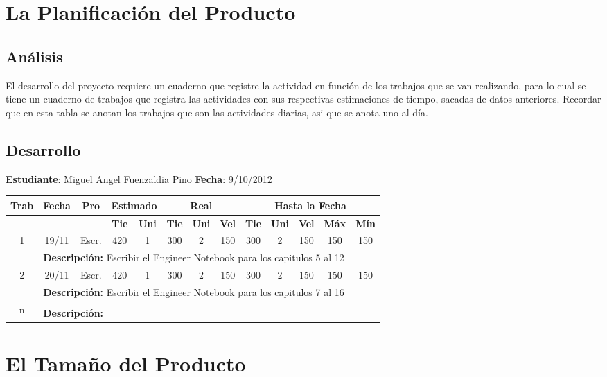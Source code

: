 \documentclass[a4paper,12pt,openany,oneside]{book}
\begin{document}
\chapter{La Planificación del Producto}
\thispagestyle{empty}
\section{Análisis}
El desarrollo del proyecto requiere un cuaderno que registre la actividad en función de los trabajos que se van realizando, para lo cual se tiene un cuaderno de trabajos que registra las actividades con sus respectivas estimaciones de tiempo, sacadas de datos anteriores. Recordar que en esta tabla se anotan los trabajos que son las actividades diarias, asi que se anota uno al día.
\section{Desarrollo}
\newpage
\textbf{Estudiante}: Miguel Angel Fuenzaldia Pino     \textbf{Fecha}: 9/10/2012\\
\begin{tabular}{|c|c|c|c|c|c|c|c|c|c|c|c|c|}
\hline
\textbf{Trab} & \textbf{Fecha} & \textbf{Pro} & \multicolumn{2}{|c|}{\textbf{Estimado}} & \multicolumn{3}{|c|}{\textbf{Real}} & \multicolumn{5}{|c|}{\textbf{Hasta la Fecha}} \\
\hline
 & & & \textbf{Tie} & \textbf{Uni} & \textbf{Tie} & \textbf{Uni} & \textbf{Vel} & \textbf{Tie} & \textbf{Uni} & \textbf{Vel} & \textbf{Máx} & \textbf{Mín} \\
\hline
\multirow{2}{*}{1} & 19/11 & Escr. & 420 & 1 & 300 & 2 & 150 & 300 & 2 & 150 & 150 & 150 \\
\cline{2-13} & \multicolumn{12}{|l|}{\textbf{Descripción:} Escribir el Engineer Notebook para los capitulos 5 al 12}\\
\hline
\multirow{2}{*}{2} & 20/11 & Escr. & 420 & 1 & 300 & 2 & 150 & 300 & 2 & 150 & 150 & 150 \\
\cline{2-13} & \multicolumn{12}{|l|}{\textbf{Descripción:} Escribir el Engineer Notebook para los capitulos 7 al 16}\\
\hline
\multirow{2}{*}{n} & & & & & & & & & & & & \\
\cline{2-13} & \multicolumn{12}{|l|}{\textbf{Descripción:}}\\
\hline
\end{tabular}
\chapter{El Tamaño del Producto}
\thispagestyle{empty}
\end{document}
